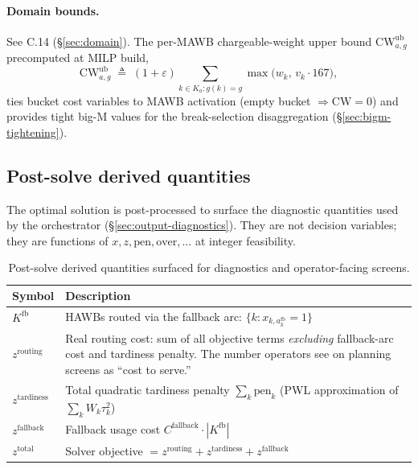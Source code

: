 \documentclass[11pt,a4paper]{article}
\newcommand{\defeq}{\triangleq}
\theoremstyle{definition}
\begin{document}
\paragraph{Domain bounds.}
See C.14 (\S\ref{sec:domain}). The per-MAWB chargeable-weight upper bound
$\text{CW}^{\text{ub}}_{a,g}$ precomputed at MILP build,
\[
  \text{CW}^{\text{ub}}_{a,g} \;\defeq\; (1 + \varepsilon) \sum_{k \in K_a : g(k) = g} \max\bigl(w_k,\, v_k \cdot 167\bigr),
\]
ties bucket cost variables to MAWB activation (empty bucket $\Rightarrow
\text{CW} = 0$) and provides tight big-M values for the break-selection
disaggregation (\S\ref{sec:bigm-tightening}).

\subsection*{Post-solve derived quantities}

The optimal solution is post-processed to surface the diagnostic quantities
used by the orchestrator (\S\ref{sec:output-diagnostics}). They are not
decision variables; they are functions of $x, z, \text{pen}, \text{over},
\ldots$ at integer feasibility.

\begin{table}[H]
\centering
\caption{Post-solve derived quantities surfaced for diagnostics and operator-facing screens.}
\label{tab:post-solve-derived}
\begin{tabular}{lp{11.5cm}}
\toprule
Symbol & Description \\
\midrule
$K^{\text{fb}}$ & HAWBs routed via the fallback arc: $\{k : x_{k, a^{\text{fb}}_k} = 1\}$ \\
$z^{\text{routing}}$ & Real routing cost: sum of all objective terms \emph{excluding} fallback-arc cost and tardiness penalty. The number operators see on planning screens as ``cost to serve.'' \\
$z^{\text{tardiness}}$ & Total quadratic tardiness penalty $\sum_k \text{pen}_k$ (PWL approximation of $\sum_k W_k \tau_k^2$) \\
$z^{\text{fallback}}$ & Fallback usage cost $C^{\text{fallback}} \cdot |K^{\text{fb}}|$ \\
$z^{\text{total}}$ & Solver objective $= z^{\text{routing}} + z^{\text{tardiness}} + z^{\text{fallback}}$ \\
\bottomrule
\end{tabular}
\end{table}

\end{document}
